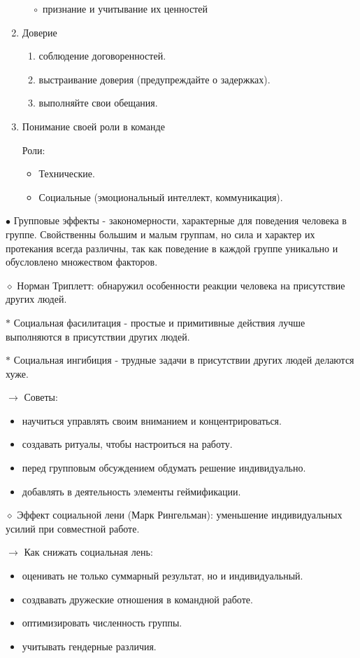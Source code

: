 \documentclass[12pt,a4paper]{report}
\begin{document}
\begin{enumerate}
	$\hspace{1em}\circ$ признание и учитывание их ценностей
	
\item Доверие
\begin{enumerate}
	\item соблюдение договоренностей.
	\item выстраивание доверия (предупреждайте о задержках).
	\item выполняйте свои обещания.
\end{enumerate}

\item Понимание своей роли в команде

Роли:
\begin{itemize}
	\item Технические.
	\item Социальные (эмоциональный интеллект, коммуникация).
\end{itemize}
\end{enumerate}

\medskip
$\bullet$ Групповые эффекты - закономерности, характерные для поведения человека в 
группе. Свойственны большим и малым группам, но сила и характер их протекания всегда 
различны, так как поведение в каждой группе уникально и обусловлено множеством факторов.

\bigskip
$\diamond$ Норман Триплетт: обнаружил особенности реакции человека на присутствие других людей.

\medskip
$\ast$ Социальная фасилитация - простые и примитивные действия лучше выполняются в присутствии других людей.

\medskip 
$\ast$ Социальная ингибиция - трудные задачи в присутствии других людей делаются хуже.

\medskip
$\rightarrow$ Советы:
\begin{itemize}
	\item научиться управлять своим вниманием и концентрироваться.
	\item создавать ритуалы, чтобы настроиться на работу.
	\item перед групповым обсуждением обдумать решение индивидуально.
	\item добавлять в деятельность элементы геймификации.
\end{itemize}

\bigskip
$\diamond$ Эффект социальной лени (Марк Рингельман): уменьшение индивидуальных усилий при совместной работе.

\medskip
$\rightarrow$ Как снижать социальная лень:
\begin{itemize}
	\item оценивать не только суммарный результат, но и индивидуальный.
	\item создвавать дружеские отношения в командной работе.
	\item оптимизировать численность группы.
	\item учитывать гендерные различия. 
\end{itemize}
\end{document}
